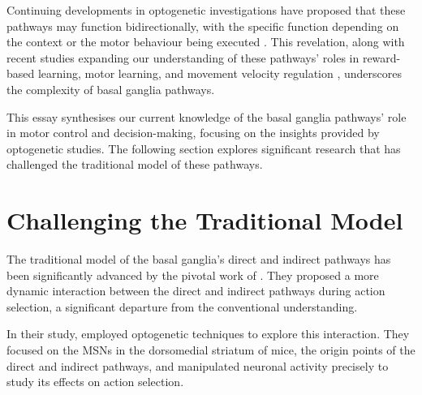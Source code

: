\documentclass[10pt]{article}
\begin{document}
\begin{sloppypar}
  Continuing developments in optogenetic investigations have proposed that these pathways may function bidirectionally, with the specific function depending on the context or the motor behaviour being executed \citep{yttri_opponent_2016}. This revelation, along with recent studies expanding our understanding of these pathways’ roles in reward-based learning, motor learning, and movement velocity regulation \citep{hilt_evidence_2016, wang_direct_2015}, underscores the complexity of basal ganglia pathways.

  This essay synthesises our current knowledge of the basal ganglia pathways’ role in motor control and decision-making, focusing on the insights provided by optogenetic studies. The following section explores significant research that has challenged the traditional model of these pathways.

  \section{Challenging the Traditional Model}
  \label{sec:challenging-the-traditional-model}

  The traditional model of the basal ganglia’s direct and indirect pathways has been significantly advanced by the pivotal work of \cite{cui_concurrent_2013}. They proposed a more dynamic interaction between the direct and indirect pathways during action selection, a significant departure from the conventional understanding.

  In their study, \cite{cui_concurrent_2013} employed optogenetic techniques to explore this interaction. They focused on the MSNs in the dorsomedial striatum of mice, the origin points of the direct and indirect pathways, and manipulated neuronal activity precisely to study its effects on action selection.


\end{sloppypar}
\end{document}

